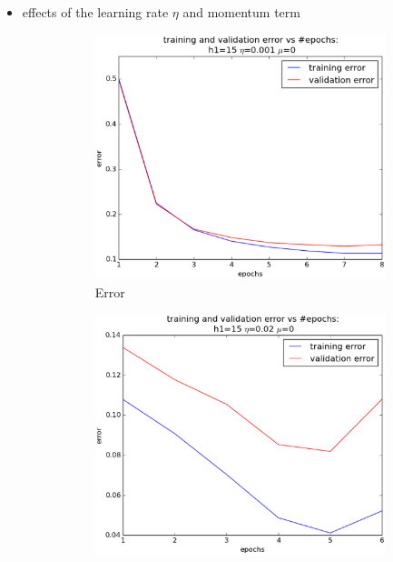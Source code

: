 \begin{itemize}

	\item effects of the learning rate $\eta$ and momentum term\\
		\begin{figure}[!ht]
		\centering
		\begin{subfigure}[b]{.45\textwidth}
		\centering
		\includegraphics[width=\textwidth]{mlp/plots/effect_eta_small.eps}
		\caption{Error }
		\end{subfigure}
		\quad
		\begin{subfigure}[b]{.45\textwidth}
		\centering
		\includegraphics[width=\textwidth]{mlp/plots/effect_eta_larger.eps}

\end{subfigure}
\end{figure}
\end{itemize}
